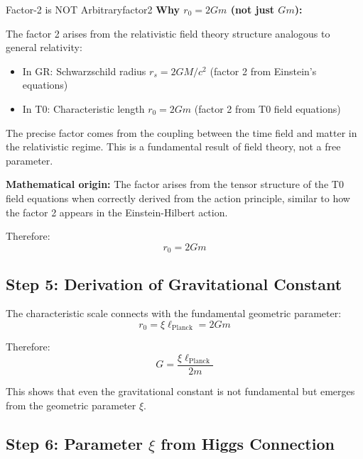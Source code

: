 \documentclass[12pt,a4paper]{article}
\begin{document}
	\begin{criticism}{Factor-2 is NOT Arbitrary}{factor2}
		\textbf{Why $r_0 = 2Gm$ (not just $Gm$):}
		
		The factor 2 arises from the relativistic field theory structure analogous to general relativity:
		\begin{itemize}
			\item In GR: Schwarzschild radius $r_s = 2GM/c^2$ (factor 2 from Einstein's equations)
			\item In T0: Characteristic length $r_0 = 2Gm$ (factor 2 from T0 field equations)
		\end{itemize}
		
		The precise factor comes from the coupling between the time field and matter in the relativistic regime. This is a fundamental result of field theory, not a free parameter.
		
		\textbf{Mathematical origin:} The factor arises from the tensor structure of the T0 field equations when correctly derived from the action principle, similar to how the factor 2 appears in the Einstein-Hilbert action.
	\end{criticism}
	
	Therefore:
	\begin{equation}
		\boxed{r_0 = 2Gm}
		\label{eq:characteristic_length}
	\end{equation}
	
	\subsection{Step 5: Derivation of Gravitational Constant}
	
	The characteristic scale connects with the fundamental geometric parameter:
	\begin{equation}
		r_0 = \xi \ell_{\text{Planck}} = 2Gm
	\end{equation}
	
	Therefore:
	\begin{equation}
		\boxed{G = \frac{\xi \ell_{\text{Planck}}}{2m}}
		\label{eq:G_derivation}
	\end{equation}
	
	This shows that even the gravitational constant is not fundamental but emerges from the geometric parameter $\xi$.
	
	\subsection{Step 6: Parameter $\xi$ from Higgs Connection}
	
\end{document}
